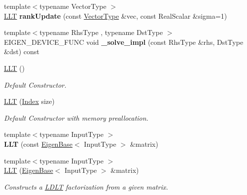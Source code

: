 \begin{DoxyCompactItemize}
\item 
\mbox{\label{group___cholesky___module_aef5a3811432035d8389d6cbc8a13370a}} 
{\footnotesize template$<$typename Vector\+Type $>$ }\\\hyperlink{group___cholesky___module_class_eigen_1_1_l_l_t}{L\+LT} {\bfseries rank\+Update} (const \hyperlink{struct_vector_type}{Vector\+Type} \&vec, const Real\+Scalar \&sigma=1)
\item 
\mbox{\label{group___cholesky___module_a4931c43521d00b110453da8d8f58f428}} 
{\footnotesize template$<$typename Rhs\+Type , typename Dst\+Type $>$ }\\E\+I\+G\+E\+N\+\_\+\+D\+E\+V\+I\+C\+E\+\_\+\+F\+U\+NC void {\bfseries \+\_\+solve\+\_\+impl} (const Rhs\+Type \&rhs, Dst\+Type \&dst) const
\item 
\hyperlink{group___cholesky___module_a16d1ec9ea6497ba1febb242c2e8a7a96}{L\+LT} ()
\begin{DoxyCompactList}\small\item\em Default Constructor. \end{DoxyCompactList}\item 
\hyperlink{group___cholesky___module_ab3656cfbdf38e03c57d5cf79bf8131b6}{L\+LT} (\hyperlink{group___cholesky___module_ac7a64274814fa76e8b1e9e945546037f}{Index} size)
\begin{DoxyCompactList}\small\item\em Default Constructor with memory preallocation. \end{DoxyCompactList}\item 
\mbox{\label{group___cholesky___module_a0f9ef009097996bbf4287024a1f05836}} 
{\footnotesize template$<$typename Input\+Type $>$ }\\{\bfseries L\+LT} (const \hyperlink{group___core___module_struct_eigen_1_1_eigen_base}{Eigen\+Base}$<$ Input\+Type $>$ \&matrix)
\item 
{\footnotesize template$<$typename Input\+Type $>$ }\\\hyperlink{group___cholesky___module_a1848a00addade9a0f7f70493c52ecc9d}{L\+LT} (\hyperlink{group___core___module_struct_eigen_1_1_eigen_base}{Eigen\+Base}$<$ Input\+Type $>$ \&matrix)
\begin{DoxyCompactList}\small\item\em Constructs a \hyperlink{group___cholesky___module_class_eigen_1_1_l_d_l_t}{L\+D\+LT} factorization from a given matrix. \end{DoxyCompactList}\item 

\end{DoxyCompactItemize}
